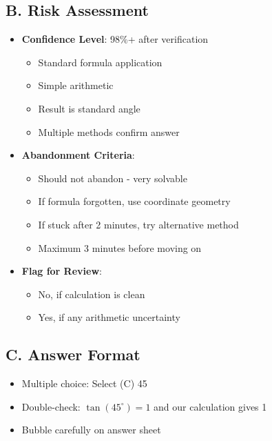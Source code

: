 \documentclass[12pt]{article}
\begin{document}
\begin{competitionbox}
\subsection*{B. Risk Assessment}
\begin{itemize}[leftmargin=*]
    \item \textbf{Confidence Level}: 98\%+ after verification
    \begin{itemize}
        \item Standard formula application
        \item Simple arithmetic
        \item Result is standard angle
        \item Multiple methods confirm answer
    \end{itemize}
    \item \textbf{Abandonment Criteria}: 
    \begin{itemize}
        \item Should not abandon - very solvable
        \item If formula forgotten, use coordinate geometry
        \item If stuck after 2 minutes, try alternative method
        \item Maximum 3 minutes before moving on
    \end{itemize}
    \item \textbf{Flag for Review}: 
    \begin{itemize}
        \item No, if calculation is clean
        \item Yes, if any arithmetic uncertainty
    \end{itemize}
\end{itemize}

\subsection*{C. Answer Format}
\begin{itemize}[leftmargin=*]
    \item Multiple choice: Select (C) 45
    \item Double-check: $\tan(45^\circ) = 1$ and our calculation gives 1 \checkmark
    \item Bubble carefully on answer sheet
\end{itemize}
\end{competitionbox}
\end{document}
